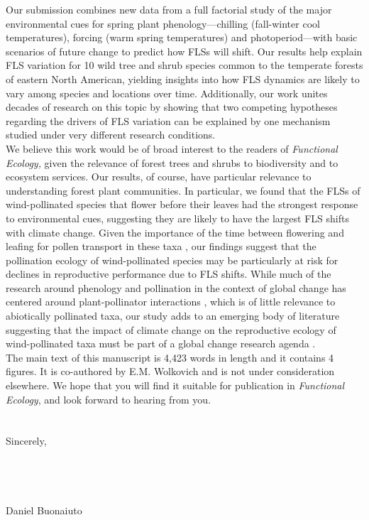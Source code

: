 \documentclass[11.75 pt]{article}\usepackage[]{graphicx}\usepackage[]{color}
\begin{document}
\noindent Our submission combines new data from a full factorial study of the major environmental cues for spring plant phenology---chilling (fall-winter cool temperatures), forcing (warm spring temperatures) and photoperiod---with basic scenarios of future change to predict how FLSs will shift. Our results help explain FLS variation for 10 wild tree and shrub species common to the temperate forests of eastern North American, yielding insights into how FLS dynamics are likely to vary among species and locations over time. Additionally, our work unites decades of research on this topic by showing that two competing hypotheses regarding the drivers of FLS variation can be explained by one mechanism studied under very different research conditions. \\

\noindent We believe this work would be of broad interest to the readers of \textit{Functional Ecology,} given the relevance of forest trees and shrubs to biodiversity and to ecosystem services. Our results, of course, have particular relevance to understanding forest plant communities. In particular, we found that the FLSs of wind-pollinated species that flower before their leaves had the strongest response to environmental cues, suggesting they are likely to have the largest FLS shifts with climate change. Given the importance of the time between flowering and leafing for pollen transport in these taxa \citep{Rathcke_1985}, our findings suggest that the pollination ecology of wind-pollinated species may be particularly at risk for declines in reproductive performance due to FLS shifts. While much of the research around phenology and pollination in the context of global change has centered around plant-pollinator interactions \citep{Settele:2016aa}, which is of little relevance to abiotically pollinated taxa, our study adds to an emerging body of literature suggesting that the impact of climate change on the reproductive ecology of wind-pollinated taxa must be part of a global change research agenda \citep{Kling:2020aa}.\\

\noindent The main text of this manuscript is 4,423 words in length and it contains 4 figures. It is co-authored by E.M. Wolkovich and is not under consideration elsewhere. We hope that you will find it suitable for publication in \textit{Functional Ecology}, and look forward to hearing from you.\\\\ %
\\Sincerely,\\\\\\\\\\

\noindent Daniel Buonaiuto\\

\pagebreak

 
\end{document}
